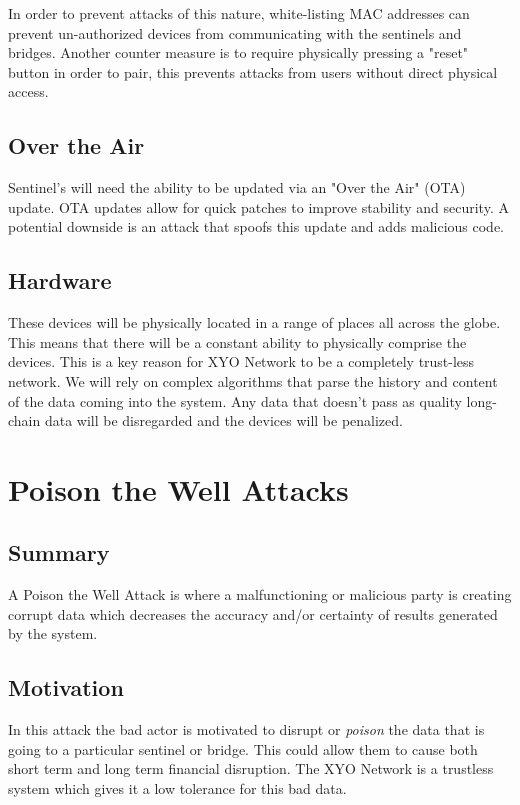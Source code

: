 \documentclass{article}
\begin{document}
In order to prevent attacks of this nature, white-listing MAC addresses can prevent un-authorized devices from communicating with the sentinels and bridges. Another counter measure is to require physically pressing a "reset" button in order to pair, this prevents attacks from users without direct physical access. 

\subsection{Over the Air}
Sentinel's will need the ability to be updated via an "Over the Air" (OTA) update. OTA updates allow for quick patches to improve stability and security. A potential downside is an attack that spoofs this update and adds malicious code. 


\subsection{Hardware}
These devices will be physically located in a range of places all across the globe. This means that there will be a constant ability to physically comprise the devices. This is a key reason for XYO Network to be a completely trust-less network. We will rely on complex algorithms that parse the history and content of the data coming into the system. Any data that doesn't pass as quality long-chain data will be disregarded and the devices will be penalized. 

\section{Poison the Well Attacks}
\subsection{Summary}
A Poison the Well Attack is where a malfunctioning or malicious party is creating corrupt data which decreases the accuracy and/or certainty of results generated by the system.

\subsection{Motivation}
In this attack the bad actor is motivated to disrupt or \emph{poison} the data that is going to a particular \gls{sentinel} or \gls{bridge}. This could allow them to cause both short term and long term financial disruption. The XYO Network is a trustless system which gives it a low tolerance for this bad data. 
\end{document}
